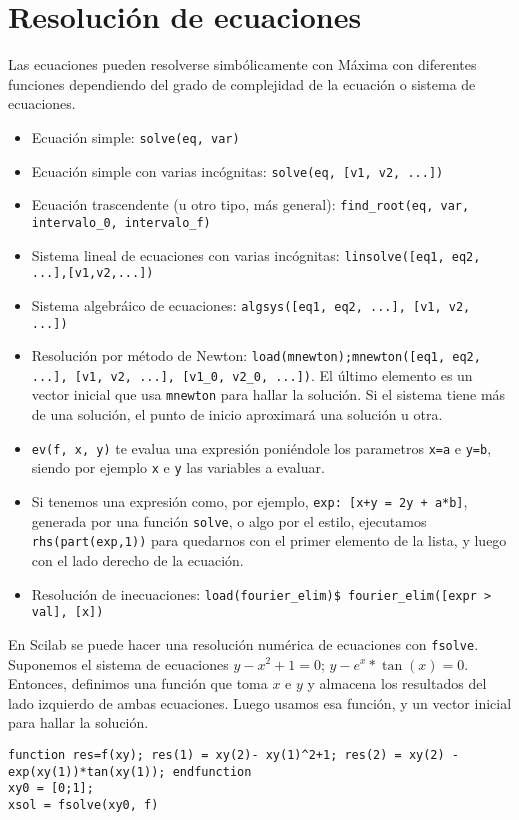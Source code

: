 \documentclass[a4paper]{article}
\begin{document}
\raggedright
\section{Resolución de ecuaciones}

Las ecuaciones pueden resolverse simbólicamente con Máxima con diferentes funciones dependiendo del grado de complejidad de la ecuación o sistema de ecuaciones.
\begin{itemize}
	\item Ecuación simple: \verb|solve(eq, var)|
	\item Ecuación simple con varias incógnitas: \verb|solve(eq, [v1, v2, ...])|
	\item Ecuación trascendente (u otro tipo, más general): \verb|find_root(eq, var, intervalo_0, intervalo_f)|
	\item Sistema lineal de ecuaciones con varias incógnitas: \verb|linsolve([eq1, eq2, ...],[v1,v2,...])|
	\item Sistema algebráico de ecuaciones: \verb|algsys([eq1, eq2, ...], [v1, v2, ...])|
	\item Resolución por método de Newton: \verb|load(mnewton);mnewton([eq1, eq2, ...], [v1, v2, ...], [v1_0, v2_0, ...])|. El último elemento es un vector inicial que usa \verb|mnewton| para hallar la solución. Si el sistema tiene más de una solución, el punto de inicio aproximará una solución u otra.
	\item \verb|ev(f, x, y)| te evalua una expresión poniéndole los parametros \verb!x=a! e \verb!y=b!, siendo por ejemplo \verb!x! e \verb!y! las variables a evaluar.
	\item Si tenemos una expresión como, por ejemplo, \verb|exp: [x+y = 2y + a*b]|, generada por una función \verb|solve|, o algo por el estilo, ejecutamos \verb|rhs(part(exp,1))| para quedarnos con el primer elemento de la lista, y luego con el lado derecho de la ecuación.
	\item Resolución de inecuaciones: \verb|load(fourier_elim)$ fourier_elim([expr > val], [x])|
\end{itemize}

En Scilab se puede hacer una resolución numérica de ecuaciones con \verb|fsolve|. Suponemos el sistema de ecuaciones $y - x^2+1=0$; $y - e^x*\tan(x) = 0$. Entonces, definimos una función que toma $x$ e $y$ y almacena los resultados del lado izquierdo de ambas ecuaciones. Luego usamos esa función, y un vector inicial para hallar la solución.

\begin{verbatim}
function res=f(xy); res(1) = xy(2)- xy(1)^2+1; res(2) = xy(2) - exp(xy(1))*tan(xy(1)); endfunction
xy0 = [0;1];
xsol = fsolve(xy0, f)
\end{verbatim}
\end{document}

